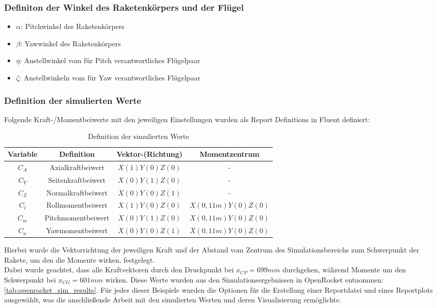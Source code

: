 \subsubsection*{Definiton der Winkel des Raketenkörpers und der Flügel}
\label{subsubsec:rocket_angle_definitions}
\begin{itemize}
    \item $\alpha$: Pitchwinkel des Raketenkörpers
    \item $\beta$: Yawwinkel des Raketenkörpers
    \item $\eta$: Anstellwinkel vom für Pitch verantwortliches Flügelpaar
    \item $\zeta$: Anstellwinkeln vom für Yaw verantwortliches Flügelpaar
\end{itemize}

\subsubsection*{Definition der simulierten Werte}
\label{subsubsec:report_definitions}
Folgende Kraft-/Momentbeiwerte mit den jeweiligen Einstellungen wurden als Report Definitions in Fluent definiert:
\begin{table}[h]
\centering
\begin{tabular}{|c|c|c|c|}
\hline
\textbf{Variable} & \textbf{Definition} & \textbf{Vektor-(Richtung)} & \textbf{Momentzentrum} \\
\hline
$C_A$ & Axialkraftbeiwert & $X(1) Y(0) Z(0)$ & - \\
$C_Y$ & Seitenkraftbeiwert & $X(0) Y(1) Z(0)$ & - \\
$C_Z$ & Normalkraftbeiwert & $X(0) Y(0) Z(1)$ & - \\
$C_l$ & Rollmomentbeiwert & $X(1) Y(0) Z(0)$ & $X(0,11m) Y(0) Z(0)$ \\
$C_m$ & Pitchmomentbeiwert & $X(0) Y(1) Z(0)$ & $X(0,11m) Y(0) Z(0)$ \\
$C_n$ & Yawmomentbeiwert & $X(0) Y(0) Z(1)$ & $X(0,11m) Y(0) Z(0)$ \\
\hline
\end{tabular}
\caption{Definition der simulierten Werte}
\label{tab:report_definitions}
\end{table}
Hierbei wurde die Vektorrichtung der jeweiligen Kraft und der Abstand vom Zentrum des Simulationsbereichs zum Schwerpunkt der Rakete, um den die Momente wirken, festgelegt.
\\
Dabei wurde geachtet, dass alle Kraftvektoren durch den Druckpunkt bei $x_{CP} = 699mm$ durchgehen, während Momente um den Schwerpunkt bei $x_{CG} = 601mm$ wirken. Diese Werte wurden aus den Simulationsergebnissen in OpenRocket entnommen: \ref{tab:openrocket_sim_results}. Für jedes dieser Beispiele wurden die Optionen für die Erstellung einer Reportdatei und eines Reportplots ausgewählt, was die anschließende Arbeit mit den simulierten Werten und deren Visualisierung ermöglichte. 

